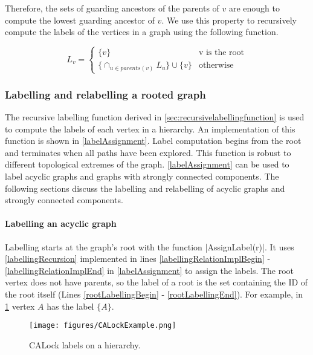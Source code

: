 Therefore, the sets of guarding ancestors of the parents of $v$ are enough to compute the lowest guarding ancestor of $v$. 
We use this property to recursively compute the labels of the vertices in a graph using the following function.

\begin{equation}\label{labellingRecursion}
	L_v = 
	\begin{cases}
		\{v\} & \text{v is the root} \\
		\{ \cap_{u\in parents(v)} L_u\} \cup \{v\} & \text{otherwise}
	\end{cases}
\end{equation}


\subsubsection{Labelling and relabelling a rooted graph}






The recursive labelling function derived in \cref{sec:recursivelabellingfunction} is used to compute the labels of each vertex in a hierarchy. An implementation of this function is shown in \cref{labelAssignment}. Label computation begins from the root and terminates when all paths have been explored. This function is robust to different topological extremes of the graph. \cref{labelAssignment} can be used to label acyclic graphs and graphs with strongly connected components. The following sections discuss the labelling and relabelling of acyclic graphs and strongly connected components. 

\paragraph{Labelling an acyclic graph}
Labelling starts at the graph's root with the function \inline|AssignLabel(r)|. It uses \cref{labellingRecursion} implemented in lines \ref{labellingRelationImplBegin} - \ref{labellingRelationImplEnd} in \cref{labelAssignment} to assign the labels. The root vertex does not have parents, so the label of a root is the set containing the ID of the root itself (Lines \ref{rootLabellingBegin} - \ref{rootLabellingEnd}). For example, in \cref{fig:calockexample} vertex $A$ has the label $\{A\}$.

\begin{figure}[h]
	\centering
	\captionsetup{justification=centering}
	\texttt{[image: figures/CALockExample.png]}
	\caption{CALock labels on a hierarchy.}
	\label{fig:calockexample}
\end{figure}

